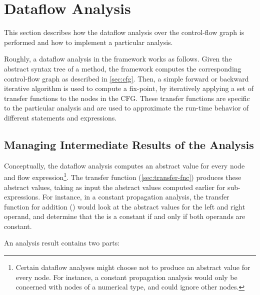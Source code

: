 \section{Dataflow Analysis}

This section describes how the dataflow analysis over the control-flow
graph is performed and how to implement a particular analysis.

Roughly, a dataflow analysis in the framework works as follows. Given
the abstract syntax tree of a method, the framework computes the
corresponding control-flow graph as described in
\autoref{sec:cfg}. Then, a simple forward or backward iterative
algorithm is used to compute a fix-point, by iteratively applying a
set of transfer functions to the nodes in the CFG\@.  These transfer
functions are specific to the particular analysis and are used to
approximate the run-time behavior of different statements and expressions.


\subsection{Managing Intermediate Results of the Analysis}
\label{sec:node-mapping}
\label{sec:store-management}


Conceptually, the dataflow analysis computes an abstract value for
every node and flow expression\footnote{Certain dataflow analyses
  might choose not to produce an abstract value for every node.  For
  instance, a constant propagation analysis would only be concerned
  with nodes of a numerical type, and could ignore other nodes.}.  The
transfer function (\autoref{sec:transfer-fnc}) produces these abstract
values, taking as input the abstract values computed earlier for
sub-expressions.  For instance, in a constant propagation analysis,
the transfer function for addition (\code{+}) would look at the
abstract values for the left and right operand, and determine that the
 is a constant if and only if both operands are
constant.

An analysis result contains two parts:

